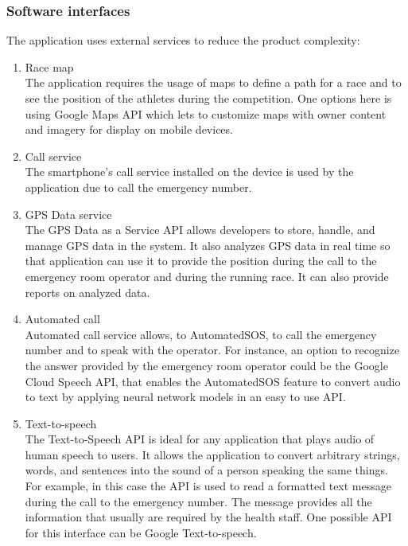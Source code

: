 \subsubsection{Software interfaces}
The application uses external services to reduce the product complexity:
\begin{enumerate}
\item Race map\\
The application requires the usage of maps to define a path for a race and to see the position of the athletes during the competition. One options here is using Google Maps API which lets to customize maps with owner content and imagery for display on mobile devices. 
\item Call service\\
The smartphone's call service installed on the device is used by the application due to call the emergency number.
\item GPS Data service\\
The GPS Data as a Service API allows developers to store, handle, and manage GPS data in the system. It also analyzes GPS data in real time so that application can use it to provide the position during the call to the emergency room operator and during the running race. It can also provide reports on analyzed data. 
\item Automated call\\
Automated call service allows, to AutomatedSOS, to call the emergency number and to speak with the operator.
For instance, an option to recognize the answer provided by the emergency room operator could be the Google Cloud Speech API, that enables the AutomatedSOS feature to convert audio to text by applying neural network models in an easy to use API. 
\item Text-to-speech\\
The Text-to-Speech API is ideal for any application that plays audio of human speech to users. It allows the application to convert arbitrary strings, words, and sentences into the sound of a person speaking the same things. For example, in this case the API is used to read a formatted text message during the call to the emergency number. The message provides all the information that usually are required by the health staff. One possible API for this interface can be Google Text-to-speech.
\end{enumerate}


